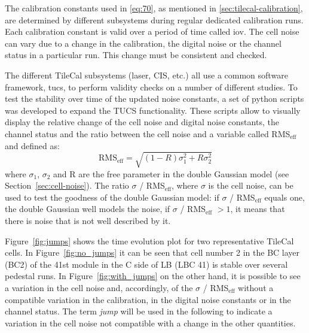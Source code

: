 The calibration constants used in \cref{eq:70}, as mentioned in
\cref{sec:tilecal-calibration}, are determined by different subsystems during
regular dedicated calibration runs. Each calibration constant is valid over a
period of time called \gls{iov}. The cell noise can vary due to a change in the
calibration, the digital noise or the channel status in a particular run. This
change must be consistent and checked.

The different TileCal subsystems (laser, CIS, etc.) all use a common software
framework, \gls{tucs}, to perform validity checks on a number of different
studies. To test the stability over time of the updated noise constants, a set
of python scripts was developed to expand the TUCS functionality. These scripts
allow to visually display the relative change of the cell noise and digital
noise constants, the channel status and the ratio between the cell noise and a
variable called RMS$_\text{eff}$ and defined as:
\begin{equation}
  \label{eq:73}
  \text{RMS}_{\text{eff}} = \sqrt{(1 - R) \sigma_1^2 + R \sigma_2^2}
\end{equation}
where $\sigma_1$, $\sigma_2$ and R are the free parameter in the double Gaussian
model (see Section~\ref{sec:cell-noise}).  The ratio $\sigma$ /
RMS$_\text{eff}$, where $\sigma$ is the cell noise, can be used to test the
goodness of the double Gaussian model: if $\sigma$ / RMS$_\text{eff}$ equals
one, the double Gaussian well models the noise, if $\sigma$ / RMS$_\text{eff}$
$> 1$, it means that there is noise that is not well described by it.

Figure~\ref{fig:jumps} shows the time evolution plot for two representative
TileCal cells. In Figure~\ref{fig:no_jumps} it can be seen that cell number 2 in
the BC layer (BC2) of the 41st module in the C side of LB (LBC 41) is stable
over several pedestal runs. In Figure~\ref{fig:with_jumps} on the other hand, it
is possible to see a variation in the cell noise and, accordingly, of the
$\sigma$ / RMS$_{\text{eff}}$ without a compatible variation in the calibration,
in the digital noise constants or in the channel status. The term \emph{jump}
will be used in the following to indicate a variation in the cell noise not
compatible with a change in the other quantities.

